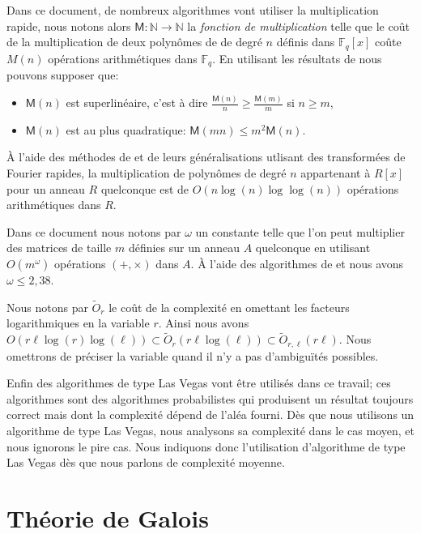\documentclass[10pt,a4paper]{book}
\theoremstyle{plain}
\theoremstyle{definition}
\theoremstyle{definition}
\theoremstyle{definition}
\theoremstyle{definition}
\theoremstyle{definition}
\theoremstyle{remark}
\theoremstyle{remark}
\theoremstyle{definition}
\begin{document}
Dans ce document, de nombreux algorithmes vont utiliser la multiplication rapide, nous notons alors $\mathsf{M}:\mathbb{N} \rightarrow \mathbb{N}$ la \emph{fonction de multiplication} telle que le coût de la multiplication de deux polynômes de de degré $n$ définis dans $\mathbb{F}_q[x]$ coûte $M(n)$ opérations arithmétiques dans $\mathbb{F}_q$. En utilisant les résultats de \cite[§8.3]{vzGJG03} nous pouvons supposer que:
\begin{itemize}
\item $\mathsf{M}(n)$ est superlinéaire, c'est à dire $\frac{\mathsf{M}(n)}{n} \geqslant \frac{\mathsf{M}(m)}{m}$ si $n \geqslant m$,
\item $\mathsf{M}(n)$ est au plus quadratique: $\mathsf{M}(mn) \leqslant m^2 \mathsf{M}(n)$.
\end{itemize} 

\`A l'aide des méthodes de \cite{SchonhageStrassen71} et de leurs généralisations  \cite{Schonhage77} \cite{Cantor-Kaltofen91} utlisant des transformées de Fourier rapides, la multiplication de polynômes de degré $n$ appartenant à $R[x]$ pour un anneau $R$ quelconque est de \newline ${O(n\log(n) \log \log (n))}$ opérations arithmétiques dans $R$.


Dans ce document nous notons par $\omega$ un constante telle que l'on peut 
multiplier des matrices de taille $m$ définies sur un anneau $A$ quelconque en
utilisant $O(m^{\omega})$ opérations $(+,\times)$ dans $A$. \`A l'aide des 
algorithmes de \cite{CoppersmithWinograd90} et \cite{Williams12} nous avons
 $\omega \leqslant 2,38$.

Nous notons par $\tilde{O}_{r}$ le coût de la complexité en omettant les facteurs 
logarithmiques en la variable $r$. Ainsi nous avons $O(r \ell \log(r) \log(\ell)) 
\subset \tilde{O}_{r}(r \ell \log(\ell)) \subset \tilde{O}_{r,\ell}(r \ell)$. 
Nous omettrons de préciser la variable quand il n'y a pas d'ambiguïtés possibles.

Enfin des algorithmes de type Las Vegas vont être utilisés dans ce travail; ces
algorithmes sont des algorithmes probabilistes qui produisent un résultat toujours 
correct mais dont la complexité dépend de l'aléa fourni. Dès que nous utilisons 
un algorithme de type Las Vegas, nous analysons sa complexité dans le cas 
moyen, et nous ignorons le pire cas. Nous indiquons donc l'utilisation 
d'algorithme de type Las Vegas dès que nous parlons de complexité moyenne.


\section{Théorie de Galois}
\end{document}
